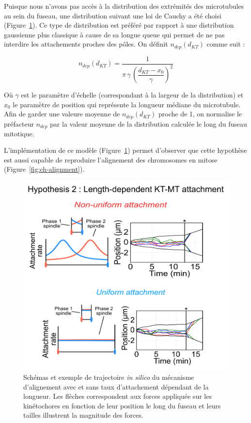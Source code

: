 \documentclass[12pt,a4paper,twoside,openright]{book}
\begin{document}
Puisque nous n'avons pas accès à la distribution des extrémités des
microtubules au sein du fuseau, une distribution suivant une loi de
Cauchy a été choisi (Figure~\ref{fig:hyp2}). Ce type de distribution est
préféré par rapport à une distribution gaussienne plus classique à cause
de sa longue queue qui permet de ne pas interdire les attachements
proches des pôles. On définit \(n_{dep}(d_{KT})\) comme suit :

\[
n_{dep}(d_{KT}) = \dfrac{1}{\pi \, \gamma \, (\dfrac{d_{KT} - x_0}{\gamma})^2}
\]

Où \(\gamma\) est le paramètre d'échelle (correspondant à la largeur de
la distribution) et \(x_0\) le paramètre de position qui représente la
longueur médiane du microtubule. Afin de garder une valeure moyenne de
\(n_{dep}(d_{KT})\) proche de 1, on normalise le préfacteur \(n_{dep}\)
par la valeur moyenne de la distribution calculée le long du fuseau
mitotique.

L'implémentation de ce modèle (Figure~\ref{fig:hyp2}) permet d'observer
que cette hypothèse est aussi capable de reproduire l'alignement des
chromosomes en mitose (Figure~\ref{fig:ch-alignment}).

\begin{figure}[htbp]
\centering
\includegraphics{figures/results/modelling/hyp2.png}
\caption[Second mécanisme expliquant l'alignement des chromosomes]{\label{fig:hyp2}Schémas
et exemple de trajectoire \emph{in silico} du mécanisme d'alignement
avec et sans taux d'attachement dépendant de la longueur. Les flèches
correspondent aux forces appliquée sur les kinétochores en fonction de
leur position le long du fuseau et leurs tailles illustrent la magnitude
des forces.}
\end{figure}
\end{document}
